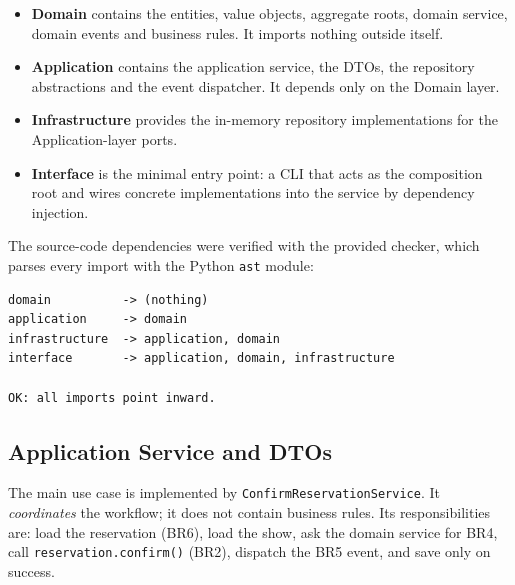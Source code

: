 \documentclass[11pt,a4paper]{article}
\newcommand{\code}[1]{\texttt{#1}}
\begin{document}
\begin{itemize}
  \item \textbf{Domain} contains the entities, value objects, aggregate roots,
        domain service, domain events and business rules. It imports nothing
        outside itself.
  \item \textbf{Application} contains the application service, the DTOs, the
        repository abstractions and the event dispatcher. It depends only on
        the Domain layer.
  \item \textbf{Infrastructure} provides the in-memory repository
        implementations for the Application-layer ports.
  \item \textbf{Interface} is the minimal entry point: a CLI that acts as the
        composition root and wires concrete implementations into the service by
        dependency injection.
\end{itemize}

The source-code dependencies were verified with the provided checker, which
parses every import with the Python \code{ast} module:

\begin{lstlisting}[style=shell,caption={Result of \code{python scripts/check\_dependencies.py}.},label=lst:layers]
domain          -> (nothing)
application     -> domain
infrastructure  -> application, domain
interface       -> application, domain, infrastructure

OK: all imports point inward.
\end{lstlisting}

\subsection{Application Service and DTOs}

The main use case is implemented by \code{ConfirmReservationService}. It
\emph{coordinates} the workflow; it does not contain business rules. Its
responsibilities are: load the reservation (BR6), load the show, ask the domain
service for BR4, call \code{reservation.confirm()} (BR2), dispatch the BR5
event, and save only on success.
\end{document}
